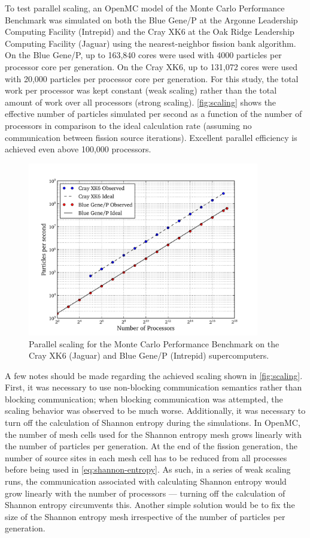 To test parallel scaling, an OpenMC model of the Monte Carlo Performance
Benchmark was simulated on both the Blue Gene/P at the Argonne Leadership
Computing Facility (Intrepid) and the Cray XK6 at the Oak Ridge Leadership
Computing Facility (Jaguar) using the nearest-neighbor fission bank
algorithm. On the Blue Gene/P, up to 163,840 cores were used with 4000 particles
per processor core per generation. On the Cray XK6, up to 131,072 cores were
used with 20,000 particles per processor core per generation. For this study,
the total work per processor was kept constant (weak scaling) rather than the
total amount of work over all processors (strong scaling). \autoref{fig:scaling}
shows the effective number of particles simulated per second as a function of
the number of processors in comparison to the ideal calculation rate (assuming
no communication between fission source iterations). Excellent parallel
efficiency is achieved even above 100,000 processors.
\begin{figure}[ht]
  \centering
  \includegraphics[width=0.9\textwidth]{figures/ch3/scaling/scaling_loglog.pdf}
  \caption{Parallel scaling for the Monte Carlo Performance Benchmark on the
    Cray XK6 (Jaguar) and Blue Gene/P (Intrepid) supercomputers.}
  \label{fig:scaling}
\end{figure}

A few notes should be made regarding the achieved scaling shown in
\autoref{fig:scaling}. First, it was necessary to use non-blocking communication
semantics rather than blocking communication; when blocking communication was
attempted, the scaling behavior was observed to be much worse. Additionally, it
was necessary to turn off the calculation of Shannon entropy during the
simulations. In OpenMC, the number of mesh cells used for the Shannon entropy
mesh grows linearly with the number of particles per generation. At the end of
the fission generation, the number of source sites in each mesh cell has to be
reduced from all processes before being used in \eqref{eq:shannon-entropy}. As
such, in a series of weak scaling runs, the communication associated with
calculating Shannon entropy would grow linearly with the number of processors
--- turning off the calculation of Shannon entropy circumvents this. Another
simple solution would be to fix the size of the Shannon entropy mesh
irrespective of the number of particles per generation.

